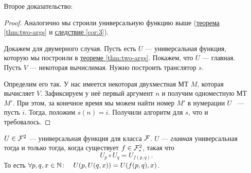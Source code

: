 \noindent 
Второе доказательство:
\begin{proof}
	Аналогично мы строили универсальную функцию выше (\hyperref[thm:two-args]{теорема \ref{thm:two-args}} и \hyperref[cor:3]{следствие \ref{cor:3}}). 

	Докажем для двумерного случая. Пусть есть $U$ --- универсальная функция, которую мы построили в \hyperref[thm:two-args]{теореме \ref{thm:two-args}}. Покажем, что $U$ --- главная. Пусть $V$ --- некоторая вычислимая. Нужно построить транслятор $s$. \par \par Определим его так. У нас имеется некоторая двухместная МТ $M$, которая вычисляет $V$. Зафиксируем у неё первый аргумент $n$ и получим одноместную МТ $M'$. При этом, за конечное время мы можем найти номер $M'$ в нумерации $U$ ~--- пусть $i$. Тогда, положим $s(n) = i$. Получили алгоритм для $s$, что и требовалось.
\end{proof}


\begin{thm}
	$ U \in \mathcal{F}^2 $ --- универсальная функция для класса $ \mathcal{F}$. $ U$ --- \textit{главная} универсальная тогда и только тогда, когда существует $ f \in \mathcal{F}^2_{*}$, такая что
	\[
		U_p \circ U_q = U_{f(p, q)}
	.\] 
	То есть $ \forall p, q, x \in \mathbb{N} \colon \quad U(p, U(q, x)) = U(f(p, q), x)$.
\end{thm}

